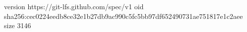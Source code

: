 version https://git-lfs.github.com/spec/v1
oid sha256:cec0224eedb8ce32e1b27db9ac990c5fc5bb97df652490731ae751817e1c2aee
size 3146
